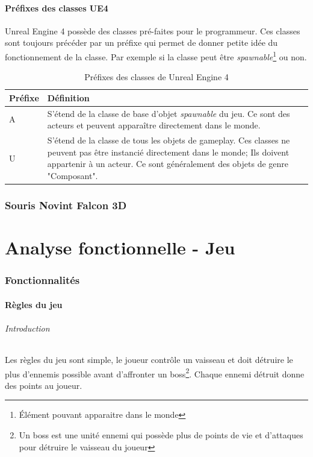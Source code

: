 \documentclass[11pt, a4paper, oneside]{article}
\begin{document}
\subsection{Préfixes des classes UE4}
Unreal Engine 4 possède des classes pré-faites pour le programmeur. Ces classes sont toujours précéder par un préfixe qui permet de donner petite idée du fonctionnement de la classe. Par exemple si la classe peut être \emph{spawnable}\footnote{Élément pouvant apparaitre dans le monde} ou non.
\begin{table}[h]
	\begin{center}
		\begin{tabularx}{\textwidth}{ l X }
			\hline
			\textbf{Préfixe} & \textbf{Définition}\\
			\hline
			\hline
			A & S'étend de la classe de base d'objet \emph{spawnable} du jeu. Ce sont des acteurs et peuvent apparaître directement dans le monde.\\
			\hline
			U & S'étend de la classe de tous les objets de gameplay. Ces classes ne peuvent pas être instancié directement dans le monde; Ils doivent appartenir à un acteur. Ce sont généralement des objets de genre "Composant".\\
			\hline
		\end{tabularx}
		\caption{Préfixes des classes de Unreal Engine 4}
		\label{table:prefixesclasses}
	\end{center}
\end{table}
\newpage

\section{Souris Novint Falcon 3D}
\newpage
\part{Analyse fonctionnelle - Jeu}
\section{Fonctionnalités}
\subsection{Règles du jeu}
\paragraph{Introduction}
Les règles du jeu sont simple, le joueur contrôle un vaisseau et doit détruire le plus d'ennemis possible avant d'affronter un boss\footnote{Un boss est une unité ennemi qui possède plus de points de vie et d'attaques pour détruire le vaisseau du joueur}. Chaque ennemi détruit donne des points au joueur.
\end{document}
